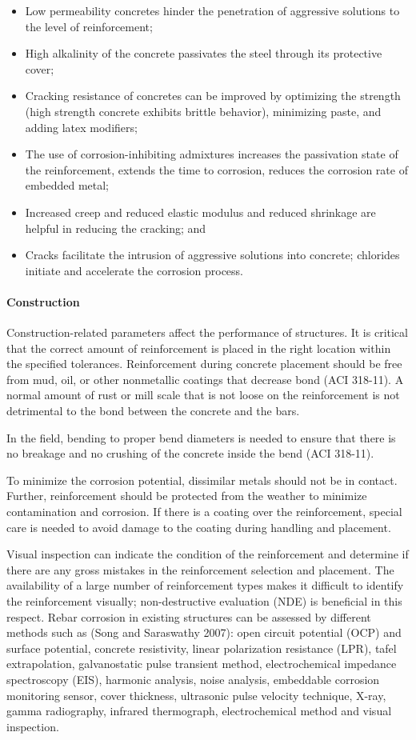\begin{itemize}
  \item Low permeability concretes hinder the penetration of aggressive solutions to the level of reinforcement;
  \item High alkalinity of the concrete passivates the steel through its protective cover;
  \item Cracking resistance of concretes can be improved by optimizing the strength (high strength concrete exhibits brittle behavior), minimizing paste, and adding latex modifiers;
  \item The use of corrosion-inhibiting admixtures increases the passivation state of the reinforcement, extends the time to corrosion, reduces the corrosion rate of embedded metal;
  \item Increased creep and reduced elastic modulus and reduced shrinkage are helpful in reducing the cracking; and
  \item Cracks facilitate the intrusion of aggressive solutions into concrete; chlorides initiate and accelerate the corrosion process.
\end{itemize}
\paragraph{Construction}
Construction-related parameters affect the performance of structures. It is critical that the correct amount of reinforcement is placed in the right location within the specified tolerances. Reinforcement during concrete placement should be free from mud, oil, or other nonmetallic coatings that decrease bond (ACI 318-11). A normal amount of rust or mill scale that is not loose on the reinforcement is not detrimental to the bond between the concrete and the bars.

In the field, bending to proper bend diameters is needed to ensure that there is no breakage and no crushing of the concrete inside the bend (ACI 318-11).

To minimize the corrosion potential, dissimilar metals should not be in contact. Further, reinforcement should be protected from the weather to minimize contamination and corrosion. If there is a coating over the reinforcement, special care is needed to avoid damage to the coating during handling and placement.

Visual inspection can indicate the condition of the reinforcement and determine if there are any gross mistakes in the reinforcement selection and placement. The availability of a large number of reinforcement types makes it difficult to identify the reinforcement visually; non-destructive evaluation (NDE) is beneficial in this respect. Rebar corrosion in existing structures can be assessed by different methods such as (Song and Saraswathy 2007): open circuit potential (OCP) and surface potential, concrete resistivity, linear polarization resistance (LPR), tafel extrapolation, galvanostatic pulse transient method, electrochemical impedance spectroscopy (EIS), harmonic analysis, noise analysis, embeddable corrosion monitoring sensor, cover thickness, ultrasonic pulse velocity technique, X-ray, gamma radiography, infrared thermograph, electrochemical method and visual inspection.

